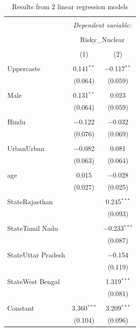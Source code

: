 \documentclass[
]{article}
\begin{document}
\begin{table}[!htbp] \centering 
  \caption{Results from 2 linear regression models} 
  \label{} 
\begin{tabular}{@{\extracolsep{5pt}}lcc} 
\\[-1.8ex]\hline 
\hline \\[-1.8ex] 
 & \multicolumn{2}{c}{\textit{Dependent variable:}} \\ 
\cline{2-3} 
\\[-1.8ex] & \multicolumn{2}{c}{Risky\_Nuclear} \\ 
\\[-1.8ex] & (1) & (2)\\ 
\hline \\[-1.8ex] 
 Uppercaste & 0.141$^{**}$ & $-$0.117$^{**}$ \\ 
  & (0.064) & (0.059) \\ 
  & & \\ 
 Male & 0.131$^{**}$ & 0.023 \\ 
  & (0.064) & (0.059) \\ 
  & & \\ 
 Hindu & $-$0.122 & $-$0.032 \\ 
  & (0.076) & (0.069) \\ 
  & & \\ 
 UrbanUrban & $-$0.082 & 0.081 \\ 
  & (0.063) & (0.064) \\ 
  & & \\ 
 age & 0.015 & $-$0.028 \\ 
  & (0.027) & (0.025) \\ 
  & & \\ 
 StateRajasthan &  & 0.245$^{***}$ \\ 
  &  & (0.093) \\ 
  & & \\ 
 StateTamil Nadu &  & $-$0.233$^{***}$ \\ 
  &  & (0.087) \\ 
  & & \\ 
 StateUttar Pradesh &  & $-$0.154 \\ 
  &  & (0.119) \\ 
  & & \\ 
 StateWest Bengal &  & 1.319$^{***}$ \\ 
  &  & (0.081) \\ 
  & & \\ 
 Constant & 3.360$^{***}$ & 3.209$^{***}$ \\ 
  & (0.104) & (0.096) \\ 

\end{tabular}
\end{table}
\end{document}
